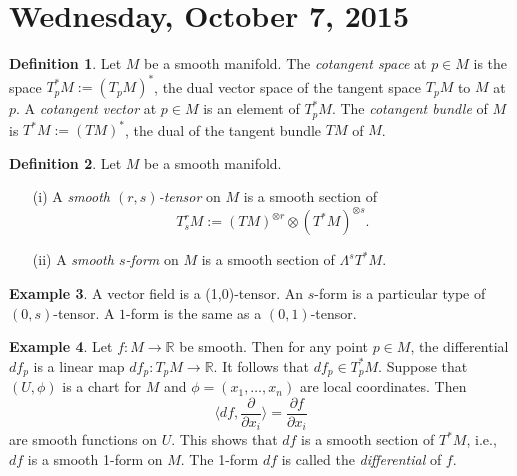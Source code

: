 \documentclass{amsart}
\numberwithin{equation}{section}
\theoremstyle{definition}
\newtheorem{definition}{Definition} [section]
\newtheorem{example}[definition]{Example}
\theoremstyle{theorem}
\begin{document}
\section{Wednesday, October 7, 2015}


\begin{definition}
Let $M$ be a smooth manifold. The {\em cotangent space} at $p \in M$ is the space 
$T^*_pM := (T_pM)^*$, the dual vector space of the tangent space $T_p M$ to $M$ at $p$. 
A {\em cotangent vector} at $p \in M$ is an element of $T_p^*M$. The {\em cotangent bundle} of $M$ is 
$T^*M:= (TM)^*$, the dual of the tangent bundle $TM$ of $M$.
\end{definition}

\begin{definition}
Let $M$ be a smooth manifold. 
\begin{enumerate}
\item[(i)] A {\em smooth $(r,s)$-tensor} on $M$ is a smooth section of 
\[
T_s^rM := (TM)^{\otimes r} \otimes (T^*M)^{\otimes s}.
\]
\item[(ii)] A {\em smooth $s$-form} on $M$ is a smooth section of $\Lambda^sT^*M$. 
\end{enumerate}
\end{definition}

\begin{example}
A vector field is a (1,0)-tensor. An $s$-form is a particular type of $(0,s)$-tensor. A $1$-form is the same as a $(0,1)$-tensor. 
\end{example}

\begin{example}
Let $f : M \to \mathbb{R}$ be smooth. Then for any point $p \in M$, the differential $df_p$ is a linear map $df_p : T_pM \to \mathbb{R}$. It follows that $df_p \in T_p^*M$. 
Suppose that $(U,\phi)$ is a chart for $M$ and $\phi=(x_1,\ldots, x_n)$ are
local coordinates. Then
$$
\langle df, \frac{\partial}{\partial x_i}\rangle = \frac{\partial f}{\partial x_i}
$$
are smooth functions on $U$. This shows that $df$ is a smooth
section of $T^*M$, i.e.,  $df$ is a smooth 1-form on $M$.
The 1-form $df$ is called the {\em differential} of $f$.  
\end{example}
\end{document}
